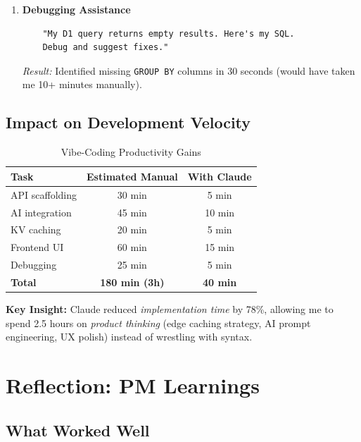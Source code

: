 \documentclass[11pt,a4paper]{article}
\begin{document}
\begin{enumerate}[leftmargin=*, itemsep=0.8em]
    \textit{Result:} UI generated in 8 minutes. I refined hover states and responsive design.
    
    \item \textbf{Debugging Assistance}
    \begin{verbatim}
    "My D1 query returns empty results. Here's my SQL. 
    Debug and suggest fixes."
    \end{verbatim}
    
    \textit{Result:} Identified missing \texttt{GROUP BY} columns in 30 seconds (would have taken me 10+ minutes manually).
\end{enumerate}

\subsection{Impact on Development Velocity}

\begin{table}[H]
\centering
\begin{tabular}{lcc}
\toprule
\textbf{Task} & \textbf{Estimated Manual} & \textbf{With Claude} \\
\midrule
API scaffolding & 30 min & 5 min \\
AI integration & 45 min & 10 min \\
KV caching & 20 min & 5 min \\
Frontend UI & 60 min & 15 min \\
Debugging & 25 min & 5 min \\
\midrule
\textbf{Total} & \textbf{180 min (3h)} & \textbf{40 min} \\
\bottomrule
\end{tabular}
\caption{Vibe-Coding Productivity Gains}
\end{table}

\textbf{Key Insight:} Claude reduced \textit{implementation time} by 78\%, allowing me to spend 2.5 hours on \textit{product thinking} (edge caching strategy, AI prompt engineering, UX polish) instead of wrestling with syntax.

\newpage

\section{Reflection: PM Learnings}

\subsection{What Worked Well}
\end{document}
